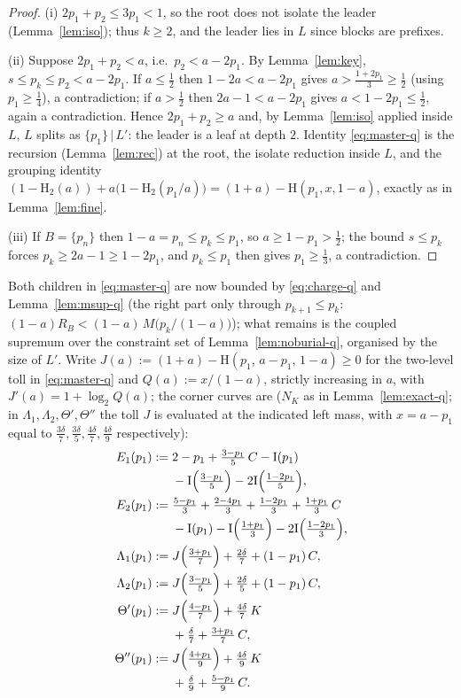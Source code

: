 \documentclass[journal]{IEEEtran}
\theoremstyle{definition}
\newcommand{\Hh}{\mathrm H_2}
\newcommand{\lgg}{\log_2}
\newcommand{\CC}{C}
\begin{document}
\begin{proof}
(i) $2p_1+p_2\le3p_1<1$, so the root does not isolate the leader
(Lemma~\ref{lem:iso}); thus $k\ge2$, and the leader lies in $L$ since
blocks are prefixes.

(ii) Suppose $2p_1+p_2<a$, i.e.\ $p_2<a-2p_1$. By Lemma~\ref{lem:key},
$s\le p_k\le p_2<a-2p_1$. If $a\le\tfrac12$ then $1-2a<a-2p_1$ gives
$a>\tfrac{1+2p_1}3\ge\tfrac12$ (using $p_1\ge\tfrac14$), a contradiction;
if $a>\tfrac12$ then $2a-1<a-2p_1$ gives $a<1-2p_1\le\tfrac12$, again a
contradiction. Hence $2p_1+p_2\ge a$ and, by Lemma~\ref{lem:iso} applied
inside $L$, $L$ splits as $\{p_1\}\,|\,L'$: the leader is a leaf at depth
$2$. Identity \eqref{eq:master-q} is the recursion (Lemma~\ref{lem:rec})
at the root, the isolate reduction inside $L$, and the grouping identity
$(1-\Hh(a))+a\bigl(1-\Hh(p_1/a)\bigr)=(1+a)-\mathrm H(p_1,x,1-a)$, exactly
as in Lemma~\ref{lem:fine}.

(iii) If $B=\{p_n\}$ then $1-a=p_n\le p_k\le p_1$, so $a\ge1-p_1>\tfrac12$;
the bound $s\le p_k$ forces $p_k\ge2a-1\ge1-2p_1$, and $p_k\le p_1$ then
gives $p_1\ge\tfrac13$, a contradiction.
\end{proof}

Both children in \eqref{eq:master-q} are now bounded by
\eqref{eq:charge-q} and Lemma~\ref{lem:msup-q} \textup{(}the right part
only through $p_{k+1}\le p_k$:
$(1-a)R_B<(1-a)\,M\bigl(p_k/(1-a)\bigr)$\textup{)}; what remains is the
coupled supremum over the constraint set of Lemma~\ref{lem:noburial-q},
organised by the size of $L'$. Write
$J(a):=(1+a)-\mathrm H(p_1,\,a-p_1,\,1-a)\ge0$ for the two-level toll in
\eqref{eq:master-q} and $Q(a):=x/(1-a)$, strictly increasing in $a$, with
$J'(a)=1+\lgg Q(a)$; the corner curves are ($N_K$ as in
Lemma~\ref{lem:exact-q}; in $\Lambda_1,\Lambda_2,\Theta',\Theta''$ the
toll $J$ is evaluated at the indicated left mass, with $x=a-p_1$ equal to
$\tfrac{3\delta}7,\tfrac{3\delta}5,\tfrac{4\delta}7,\tfrac{4\delta}9$
respectively):
\begin{align*}
  E_1(p_1)&:=2-p_1+\tfrac{3-p_1}{5}\,\CC-\mathrm I(p_1)\\
   &\phantom{{}:={}}-\mathrm I\Bigl(\tfrac{3-p_1}{5}\Bigr)-2\mathrm I\Bigl(\tfrac{1-2p_1}{5}\Bigr),\\
  E_2(p_1)&:=\tfrac{5-p_1}{3}+\tfrac{2-4p_1}{3}+\tfrac{1-2p_1}{3}
   +\tfrac{1+p_1}{3}\,\CC\\
   &\phantom{{}:={}}-\mathrm I(p_1)-\mathrm I\Bigl(\tfrac{1+p_1}{3}\Bigr)-2\mathrm I\Bigl(\tfrac{1-2p_1}{3}\Bigr),\\
  \Lambda_1(p_1)&:=J\Bigl(\tfrac{3+p_1}{7}\Bigr)+\tfrac{2\delta}{7}+(1-p_1)\,\CC,\\
  \Lambda_2(p_1)&:=J\Bigl(\tfrac{3-p_1}{5}\Bigr)+\tfrac{2\delta}{5}+(1-p_1)\,\CC,\\
  \Theta'(p_1)&:=J\Bigl(\tfrac{4-p_1}{7}\Bigr)+\tfrac{4\delta}{7}\,K\\
   &\phantom{{}:={}}+\tfrac{\delta}{7}+\tfrac{3+p_1}{7}\,\CC,\\
  \Theta''(p_1)&:=J\Bigl(\tfrac{4+p_1}{9}\Bigr)+\tfrac{4\delta}{9}\,K\\
   &\phantom{{}:={}}+\tfrac{\delta}{9}+\tfrac{5-p_1}{9}\,\CC .
\end{align*}
\end{document}
